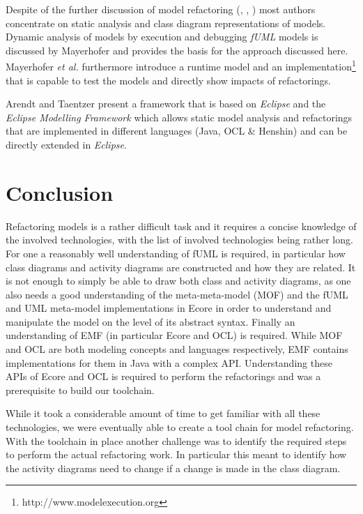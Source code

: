 \documentclass{llncs}
\begin{document}

Despite of the further discussion of model refactoring (\cite{DBLP:conf/uml/CorreaW04}, \cite{DBLP:conf/ershov/BaarM06},
\cite{DBLP:journals/ase/ArendtT13}) most authors concentrate on static analysis and class diagram representations of
models. Dynamic analysis of models by execution and debugging \textit{fUML} models is discussed by Mayerhofer
\cite{DBLP:conf/icse/Mayerhofer12} and provides the basis for the approach discussed here. Mayerhofer \textit{et al.}
\cite{DBLP:conf/models/MayerhoferLK12} furthermore introduce a runtime model and an
implementation\footnote{http://www.modelexecution.org} that is capable to test the models and directly show impacts of
refactorings.


Arendt and Taentzer \cite{DBLP:journals/ase/ArendtT13} present a framework that is based on \textit{Eclipse} and the
\textit{Eclipse Modelling Framework} which allows static model analysis and refactorings that are implemented in
different languages (Java, OCL \& Henshin) and can be directly extended in \textit{Eclipse}.


\section{Conclusion}
\label{sec:conclusion}
Refactoring models is a rather difficult task and it requires a concise knowledge of the involved technologies, with
the list of involved technologies being rather long. For one a reasonably well understanding of fUML is required, in
particular how class diagrams and activity diagrams are constructed and how they are related. It is not enough to simply
be able to draw both class and activity diagrams, as one also needs a good understanding of the meta-meta-model (MOF) and
the fUML and UML meta-model implementations in Ecore in order to understand and manipulate the model on the level of its 
abstract syntax. Finally an understanding of EMF (in particular Ecore and OCL) is required. While MOF and OCL are both 
modeling concepts and languages respectively, EMF contains implementations for them in Java with a complex API. 
Understanding these APIs of Ecore and OCL is required to perform the refactorings and was a prerequisite to build
our toolchain.

While it took a considerable amount of time to get familiar with all these technologies, we were eventually able to
create a tool chain for model refactoring. With the toolchain in place another challenge was to identify the required 
steps to perform the actual refactoring work. In particular this meant to identify how the activity diagrams need to 
change if a change is made in the class diagram.
\end{document}
